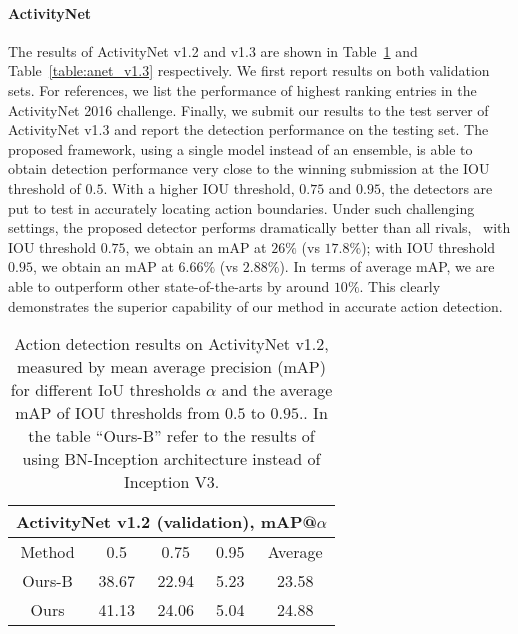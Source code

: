\documentclass[10pt,twocolumn,letterpaper]{article}
\begin{document}
\paragraph{ActivityNet}
The results of ActivityNet v1.2 and v1.3 are shown in Table~\ref{table:anet_v1.2} and Table~\ref{table:anet_v1.3} respectively. 
We first report results on both validation sets.
For references, we list the performance of highest ranking entries in the ActivityNet 2016 challenge.
Finally, we submit our results to the test server of ActivityNet v1.3 and report the detection performance on the testing set.
The proposed framework, using a single model instead of an ensemble, is able to obtain detection performance very close to the winning submission at the IOU threshold of $ 0.5 $.
With a higher IOU threshold, $0.75$ and $0.95$, the detectors are put to test in accurately locating action boundaries.
Under such challenging settings, the proposed detector performs dramatically better than all rivals,
\eg~with IOU threshold $0.75$, we obtain an mAP at $26\%$ (vs $17.8\%$);
with IOU threshold $0.95$, we obtain an mAP at $6.66\%$ (vs $2.88\%$).
In terms of average mAP, we are able to outperform other state-of-the-arts by around $10 \%$.
This clearly demonstrates the superior capability of our method in accurate action detection.


\begin{table}[t]
	\begin{center}
		\begin{tabular}{c|ccc|c}
			\hline
			\multicolumn{5}{c}{\textbf{ActivityNet v1.2} (validation),  \textbf{mAP@$\alpha$}}   \\ \hline
			Method & 0.5 & 0.75 & 0.95 &Average\\ \hline
			Ours-B &    38.67     &     22.94     &     5.23     &       23.58      \\ \hline
			Ours &    41.13     &     24.06     &     5.04     &       24.88      \\ \hline
		\end{tabular}

	\end{center}
	\caption{Action detection results on ActivityNet v1.2, measured by mean average precision (mAP) for different IoU thresholds $\alpha$ and the average mAP of IOU thresholds from $ 0.5 $ to $ 0.95 $..
		In the table ``Ours-B'' refer to the results of using BN-Inception architecture instead of Inception V3.}
	\label{table:anet_v1.2}
\end{table}
\end{document}
